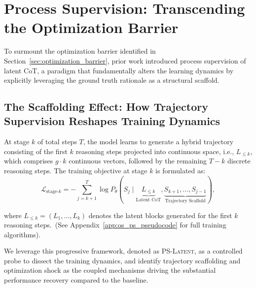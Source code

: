 
\section{Process Supervision: Transcending the Optimization Barrier}
\label{sec:process_supervision}

To surmount the optimization barrier identified in Section~\ref{sec:optimization_barrier}, prior work \citep{hao2025training} introduced process supervision of latent CoT, a paradigm that fundamentally alters the learning dynamics by explicitly leveraging the ground truth rationale as a structural scaffold.





\subsection{The Scaffolding Effect: How Trajectory Supervision Reshapes Training Dynamics}
\label{subsec:ps_dynamics}
 
At stage $k$ of total steps $T$, the model learns to generate a hybrid trajectory consisting of the first $k$ reasoning steps projected into continuous space, i.e., $L_{\le k}$, which comprises $g\cdot k$ continuous vectors, followed by the remaining $T-k$ discrete reasoning steps. The training objective at stage $k$ is formulated as:
\begin{equation}
    \mathcal{L}_{\text{stage-}k}
    =
    - \sum_{j=k+1}^{T}
    \log P_{\theta}
    \left(
        S_j
        \mid
        \underbrace{L_{\le k}}_{\text{Latent CoT}},
        \underbrace{S_{k+1}, \dots, S_{j-1}}_{\text{Trajectory Scaffold}}
    \right),
    \label{eq:progressive_objective}
\end{equation}

 
where $L_{\le k}=(L_1,\ldots,L_k)$ denotes the latent blocks generated for the first $k$ reasoning steps.~(See Appendix~\ref{app:os_ps_pseudocode} for full training algorithms).

We leverage this progressive framework, denoted as \textsc{PS-Latent}, as a controlled probe to dissect the training dynamics, and identify trajectory scaffolding and optimization shock as the coupled mechanisms driving the substantial performance recovery compared to the baseline.

